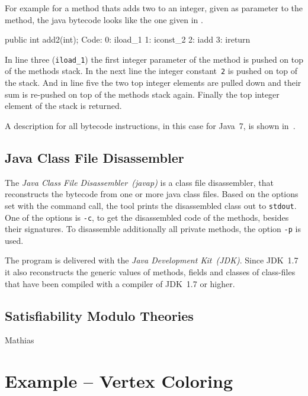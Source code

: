 \documentclass[conference]{IEEEtran}
\begin{document}
For example for a method thats adds two to an integer, given as parameter to
the method, the java bytecode looks like the one given in
.

\begin{bytecodelst}[caption=Java bytecode list for a Method that adds up 2,
    label=lst:example_bytecode_add_up_2]
public int add2(int);
  Code:
   0: iload_1
   1: iconst_2
   2: iadd
   3: ireturn
\end{bytecodelst}

In line three (\texttt{iload\_1}) the first integer parameter of the method is
pushed on top of the methods stack. In the next line the integer
constant~\texttt{2} is pushed on top of the stack. And in line five the two top
integer elements are pulled down and their sum is re-pushed on top of the
methods stack again. Finally the top integer element of the stack is returned.

A description for all bytecode instructions, in this case for Java~7, is shown
in~\cite{LindholmYBB11}.

\subsection{Java Class File Disassembler}
\label{sec:prelim_javap}

The \emph{Java Class File Disassembler~(javap)} is a class file disassembler,
that reconstructs the bytecode from one or more java class files. Based on the
options set with the command call, the tool prints the disassembled class out
to \texttt{stdout}. One of the options is \texttt{-c}, to get the disassembled
code of the methods, besides their signatures. To disassemble additionally all
private methods, the option \texttt{-p} is used.

The program is delivered with the \emph{Java Development Kit~(JDK)}. Since
JDK~1.7 it also reconstructs the generic values of methods, fields and classes
of class-files that have been compiled with a compiler of JDK~1.7 or higher.

\subsection{Satisfiability Modulo Theories}
\label{sec:prelim_smt}

\danger Mathias

\section{Example -- Vertex Coloring}
\label{sec:example_vertex_coloring}
\end{document}
